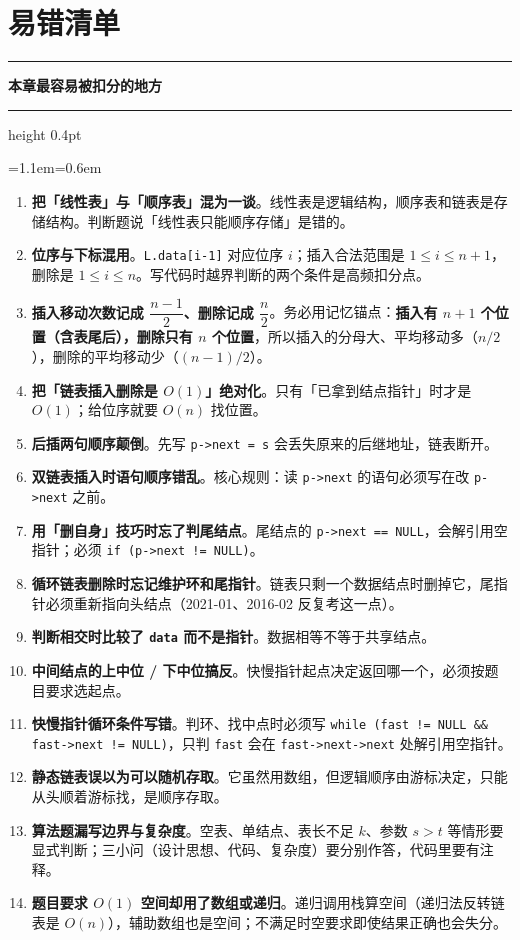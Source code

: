 \documentclass[11pt,openany,UTF8]{ctexbook}
\newcommand{\callouthead}[2]{%
  \par\addvspace{7pt}\noindent
  {\color{#1}\rule[-0.15em]{3pt}{1.05em}}\hspace{0.5em}%
  {\bfseries\color{#1}#2}\par\nobreak\vspace{-0.35em}%
  {\color{rulesep}\hrule height 0.4pt}\nobreak\vspace{0.45em}%
  \begingroup\small\setlength{\parindent}{0pt}%
  \leftskip=1.1em\rightskip=0.6em\noindent\ignorespaces}
\newcommand{\calloutend}{\par\endgroup\addvspace{7pt}}
\newenvironment{callwarn}[1]{\callouthead{warnbar}{#1}}{\calloutend}
\begin{document}
\section*{易错清单}

\begin{callwarn}{本章最容易被扣分的地方}
\begin{enumerate}
\item \textbf{把「线性表」与「顺序表」混为一谈}。线性表是逻辑结构，顺序表和链表是存储结构。判断题说「线性表只能顺序存储」是错的。
\item \textbf{位序与下标混用}。\texttt{L.data[i-1]\allowbreak{}} 对应位序 $i$；插入合法范围是 $1 \le i \le n+1$，删除是 $1 \le i \le n$。写代码时越界判断的两个条件是高频扣分点。
\item \textbf{插入移动次数记成 $\dfrac{n-1}{2}$、删除记成 $\dfrac{n}{2}$}。务必用记忆锚点：\textbf{插入有 $n+1$ 个位置（含表尾后），删除只有 $n$ 个位置}，所以插入的分母大、平均移动多（$n/2$），删除的平均移动少（$(n-1)/2$）。
\item \textbf{把「链表插入删除是 $O(1)$」绝对化}。只有「已拿到结点指针」时才是 $O(1)$；给位序就要 $O(n)$ 找位置。
\item \textbf{后插两句顺序颠倒}。先写 \texttt{p->\allowbreak{}next =\allowbreak{} s} 会丢失原来的后继地址，链表断开。
\item \textbf{双链表插入时语句顺序错乱}。核心规则：读 \texttt{p->\allowbreak{}next} 的语句必须写在改 \texttt{p->\allowbreak{}next} 之前。
\item \textbf{用「删自身」技巧时忘了判尾结点}。尾结点的 \texttt{p->\allowbreak{}next =\allowbreak{}=\allowbreak{} NULL}，会解引用空指针；必须 \texttt{if (p->\allowbreak{}next !=\allowbreak{} NULL)\allowbreak{}}。
\item \textbf{循环链表删除时忘记维护环和尾指针}。链表只剩一个数据结点时删掉它，尾指针必须重新指向头结点（2021-01、2016-02 反复考这一点）。
\item \textbf{判断相交时比较了 \texttt{data} 而不是指针}。数据相等不等于共享结点。
\item \textbf{中间结点的上中位 / 下中位搞反}。快慢指针起点决定返回哪一个，必须按题目要求选起点。
\item \textbf{快慢指针循环条件写错}。判环、找中点时必须写 \texttt{while (fast !=\allowbreak{} NULL \&\& fast->\allowbreak{}next !=\allowbreak{} NULL)\allowbreak{}}，只判 \texttt{fast} 会在 \texttt{fast->\allowbreak{}next->\allowbreak{}next} 处解引用空指针。
\item \textbf{静态链表误以为可以随机存取}。它虽然用数组，但逻辑顺序由游标决定，只能从头顺着游标找，是顺序存取。
\item \textbf{算法题漏写边界与复杂度}。空表、单结点、表长不足 $k$、参数 $s>t$ 等情形要显式判断；三小问（设计思想、代码、复杂度）要分别作答，代码里要有注释。
\item \textbf{题目要求 $O(1)$ 空间却用了数组或递归}。递归调用栈算空间（递归法反转链表是 $O(n)$），辅助数组也是空间；不满足时空要求即使结果正确也会失分。
\end{enumerate}
\end{callwarn}
\end{document}

